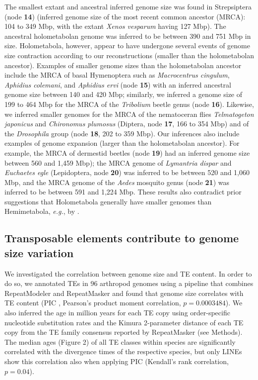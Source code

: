 The smallest extant and ancestral inferred genome size was found in
Strepsiptera (node \textbf{14}) (inferred genome size of the most recent
common ancestor (MRCA): 104 to 349 Mbp, with the extant \emph{Xenos
vesparum} having 127 Mbp). The ancestral holometabolan genome was
inferred to be between 390 and 751 Mbp in size. Holometabola, however,
appear to have undergone several events of genome size contraction
according to our reconstructions (smaller than the holometabolan
ancestor). Examples of smaller genome sizes than the holometabolan
ancestor include the MRCA of basal Hymenoptera such as
\emph{Macrocentrus cingulum}, \emph{Aphidius colemani}, and
\emph{Aphidius ervi} (node \textbf{15}) with an inferred ancestral
genome size between 140 and 420 Mbp; similarly, we inferred a genome
size of 199 to 464 Mbp for the MRCA of the \emph{Tribolium} beetle genus
(node \textbf{16}). Likewise, we inferred smaller genomes for the MRCA
of the nematoceran flies \emph{Telmatogeton japonicus} and
\emph{Chironomus plumosus} (Diptera, node \textbf{17}, 166 to 354 Mbp)
and of the \emph{Drosophila} group (node \textbf{18}, 202 to 359 Mbp).
Our inferences also include examples of genome expansion (larger than
the holometabolan ancestor). For example, the MRCA of dermestid beetles
(node \textbf{19}) had an inferred genome size between 560 and 1,459
Mbp); the MRCA genome of \emph{Lymantria dispar} and \emph{Euchaetes
egle} (Lepidoptera, node \textbf{20}) was inferred to be between 520 and
1,060 Mbp, and the MRCA genome of the \emph{Aedes} mosquito genus (node
\textbf{21}) was inferred to be between 591 and 1,224 Mbp. These results
also contradict prior suggestions that Holometabola generally have
smaller genomes than Hemimetabola, \emph{e.g.}, by \citet{Hanrahan2011}.

\subsection*{Transposable elements contribute to genome size
variation}\label{transposable-elements-contribute-to-genome-size-variation}

We investigated the correlation between genome size and TE content. In
order to do so, we annotated TEs in 96 arthropod genomes using a
pipeline that combines RepeatModeler \citep{Smit2015a} and RepeatMasker
\citep{Smit2015} and found that genome size correlates with TE content
(PIC \citep{Felsenstein1985}, Pearson's product moment correlation,
\(p = 0.0003484\)). We also inferred the age in million years for each
TE copy using order-specific nucleotide substitution rates and the
Kimura 2-parameter distance of each TE copy from the TE family consensus
reported by RepeatMasker (see Methods). The median ages (Figure 2) of
all TE classes within species are significantly correlated with the
divergence times of the respective species, but only LINEs show this
correlation also when applying PIC (Kendall's rank correlation,
\(p = 0.04\)).

